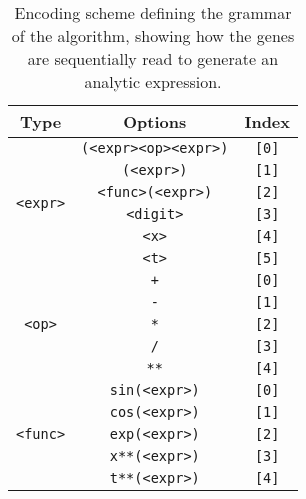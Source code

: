 \documentclass[multicolumn, 12pt]{extarticle}
\begin{document}
\begin{table}[h]
\centering
    \caption{Encoding scheme defining the grammar of the algorithm, showing how the genes are sequentially read to generate an analytic expression.}
    \label{tab:grammar}  
        \begin{tabular}{ccc}
        \toprule
        Type & Options & Index \\
        \midrule
             
             \multirow{6}{*}{\texttt{<expr>}} 
             		& \multicolumn{1}{c}{\texttt{(<expr><op><expr>)}} & \multicolumn{1}{c}{\texttt{[0]}} \\
                                & \multicolumn{1}{c}{\texttt{(<expr>)}} & \multicolumn{1}{c}{\texttt{[1]}} \\
                                & \multicolumn{1}{c}{\texttt{<func>(<expr>)}} & \multicolumn{1}{c}{\texttt{[2]}} \\
                                & \multicolumn{1}{c}{\texttt{<digit>}} & \multicolumn{1}{c}{\texttt{[3]}} \\
                                & \multicolumn{1}{c}{\texttt{<x>}} & \multicolumn{1}{c}{\texttt{[4]}} \\
                                & \multicolumn{1}{c}{\texttt{<t>}} & \multicolumn{1}{c}{\texttt{[5]}} \\                        
                                 
	\midrule
        
            \multirow{5}{*}{\texttt{<op>}} 
            		& \multicolumn{1}{c}{\texttt{+}} & \multicolumn{1}{c}{\texttt{[0]}} \\
                                & \multicolumn{1}{c}{\texttt{-}} & \multicolumn{1}{c}{\texttt{[1]}} \\
                                & \multicolumn{1}{c}{\texttt{*}} & \multicolumn{1}{c}{\texttt{[2]}} \\
                                & \multicolumn{1}{c}{\texttt{/}} & \multicolumn{1}{c}{\texttt{[3]}} \\
                                & \multicolumn{1}{c}{\texttt{**}} & \multicolumn{1}{c}{\texttt{[4]}} \\
                                
	\midrule
        
            \multirow{5}{*}{\texttt{<func>}} 
                                & \multicolumn{1}{c}{\texttt{sin(<expr>)}} & \multicolumn{1}{c}{\texttt{[0]}} \\
                                & \multicolumn{1}{c}{\texttt{cos(<expr>)}} & \multicolumn{1}{c}{\texttt{[1]}} \\
                                & \multicolumn{1}{c}{\texttt{exp(<expr>)}} & \multicolumn{1}{c}{\texttt{[2]}} \\
                                & \multicolumn{1}{c}{\texttt{x**(<expr>)}} & \multicolumn{1}{c}{\texttt{[3]}} \\
                                & \multicolumn{1}{c}{\texttt{t**(<expr>)}} & \multicolumn{1}{c}{\texttt{[4]}} \\


\end{tabular}
\end{table}
\end{document}
